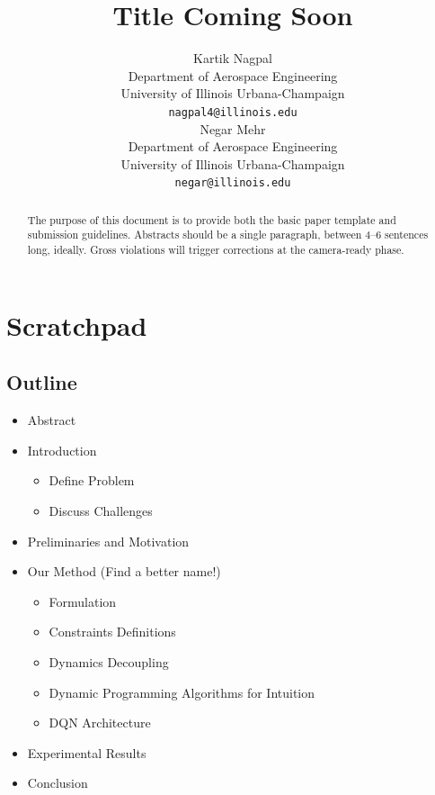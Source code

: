 \documentclass{article}
\title{Title Coming Soon}
\author{
  Kartik Nagpal\\
  Department of Aerospace Engineering\\
  University of Illinois Urbana-Champaign\\
  \texttt{nagpal4@illinois.edu} \\
  \And
  Negar Mehr \\
  Department of Aerospace Engineering\\
  University of Illinois Urbana-Champaign\\
  \texttt{negar@illinois.edu} \\
}
\begin{document}
\maketitle


\begin{abstract}
    The purpose of this document is to provide both the basic paper template and submission guidelines. Abstracts should be a single paragraph, between 4--6 sentences long, ideally. Gross violations will trigger corrections at the camera-ready phase.
\end{abstract}



\section{Scratchpad}

\subsection{Outline}
\begin{itemize}
 \item Abstract
 \item Introduction
 \begin{itemize}
     \item Define Problem
     \item Discuss Challenges
 \end{itemize}
 \item Preliminaries and Motivation
 \item Our Method (Find a better name!)
 \begin{itemize}
     \item Formulation
     \item Constraints Definitions
     \item Dynamics Decoupling
     \item Dynamic Programming Algorithms for Intuition
     \item DQN Architecture
 \end{itemize}
 \item Experimental Results
 \item Conclusion
\end{itemize}
\end{document}
